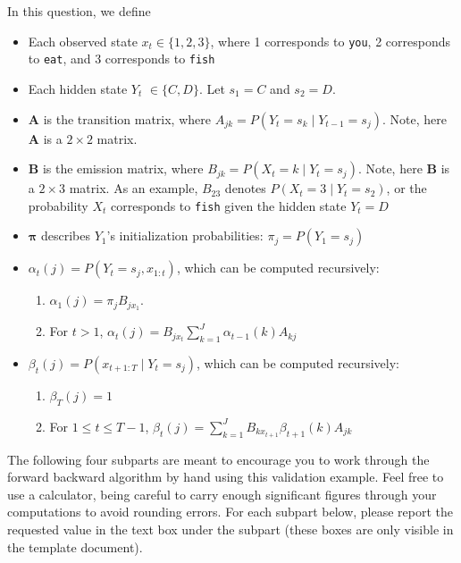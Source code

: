 \documentclass[11pt,addpoints,answers]{exam}
\begin{document}
\begin{questions}
\begin{parts}
\vspace{0.5cm}
In this question, we define
\begin{itemize}
    \item Each observed state $x_t \in \{1,2,3\}$, where 1 corresponds to \texttt{you}, 2 corresponds to \texttt{eat}, and 3 corresponds to \texttt{fish}
    \item Each hidden state $Y_t$ $\in \{C,D\}$. Let $s_1 = C$ and $s_2 = D$.
    \item $\mathbf{A}$ is the transition matrix, where $A_{jk} = P(Y_{t} = s_{k} \mid Y_{t-1} = s_{j})$. Note, here $\mathbf{A}$ is a $2 \times 2$ matrix. 
    \item $\mathbf{B}$ is the emission matrix, where $B_{jk} = P(X_{t} = k \mid Y_{t} = s_{j})$. Note, here $\mathbf{B}$ is a $2 \times 3$ matrix. As an example, $B_{23}$ denotes $P(X_{t} = 3 \mid Y_{t} = s_{2})$, or the probability $X_{t}$ corresponds to \texttt{fish} given the hidden state $Y_t = D$
    \item $\boldsymbol{\pi}$ describes $Y_1$'s initialization probabilities: $\pi_j = P(Y_1 = s_j)$
    \vspace{1.5cm}
    \item $\alpha_t(j) = P(Y_t = s_j, x_{1:t})$, which can be computed recursively:
        \begin{enumerate}
            \item $\alpha_1(j)=\pi_jB_{jx_1}$. 
            \item For $t > 1$, $\alpha_{t}(j)=B_{jx_{t}}\sum_{k=1}^{J}\alpha_{t-1}(k)A_{kj}$ 
        \end{enumerate}
    \item  $\beta_t(j) = P(x_{t+1:T} \mid Y_t = s_j)$, which can be computed recursively:
        \begin{enumerate}
            \item $\beta_T(j) = 1$ 
            \item  For $1\leq t \leq T-1$, $\beta_t(j) = \sum_{k=1}^{J}B_{kx_{t+1}}\beta_{t+1}(k)A_{jk}$ 
        \end{enumerate}
\end{itemize} 
\vspace{0.5cm}

The following four subparts are meant to encourage you to work through the forward backward algorithm by hand using this validation example. Feel free to use a calculator, being careful to carry enough significant figures through your computations to avoid rounding errors. For each subpart below, please report the requested value in the text box under the subpart (these boxes are only visible in the template document). 


\end{parts}
\end{questions}
\end{document}
